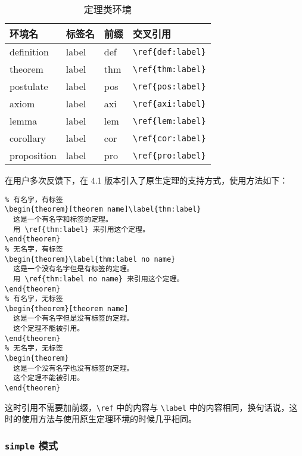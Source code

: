 \documentclass[lang=cn,newtx,10pt,scheme=chinese,color=black]{elegantbook}
\begin{document}
\begin{table}[htbp]
  \centering
  \caption{定理类环境}
    \begin{tabular}{llll}
    \toprule
    环境名 & 标签名 & 前缀 & 交叉引用 \\
    \midrule
    definition & label & def   & \lstinline|\ref{def:label}| \\
    theorem & label & thm   & \lstinline|\ref{thm:label}| \\
    postulate & label & pos & \lstinline|\ref{pos:label}| \\
    axiom & label & axi & \lstinline|\ref{axi:label}|\\
    lemma & label & lem   & \lstinline|\ref{lem:label}| \\
    corollary & label & cor   & \lstinline|\ref{cor:label}| \\
    proposition & label & pro   & \lstinline|\ref{pro:label}| \\
    \bottomrule
    \end{tabular}%
  \label{tab:theorem-class}%
\end{table}%

在用户多次反馈下，在 4.1 版本引入了原生定理的支持方式，使用方法如下：

\begin{lstlisting}
% 有名字，有标签
\begin{theorem}[theorem name]\label{thm:label}
  这是一个有名字和标签的定理。
  用 \ref{thm:label} 来引用这个定理。
\end{theorem}
% 无名字，有标签
\begin{theorem}\label{thm:label no name}
  这是一个没有名字但是有标签的定理。
  用 \ref{thm:label no name} 来引用这个定理。
\end{theorem}
% 有名字，无标签
\begin{theorem}[theorem name]
  这是一个有名字但是没有标签的定理。
  这个定理不能被引用。
\end{theorem}
% 无名字，无标签
\begin{theorem}
  这是一个没有名字也没有标签的定理。
  这个定理不能被引用。
\end{theorem}
\end{lstlisting}
这时引用不需要加前缀，\lstinline{\ref} 中的内容与 \lstinline{\label} 中的内容相同，换句话说，这时的使用方法与使用原生定理环境的时候几乎相同。

\subsubsection{\texttt{simple} 模式}
\end{document}
